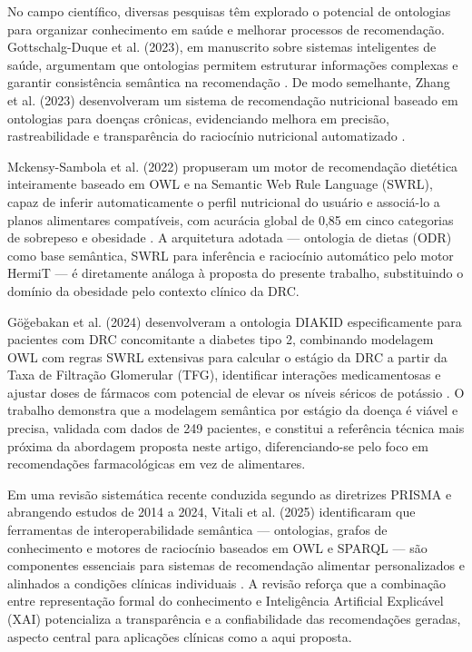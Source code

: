 \documentclass[12pt, a4paper, twocolumn]{article}
\begin{document}
No campo científico, diversas pesquisas têm explorado o potencial de ontologias para organizar conhecimento em saúde e melhorar processos de recomendação. Gottschalg-Duque et al. (2023), em manuscrito sobre sistemas inteligentes de saúde, argumentam que ontologias permitem estruturar informações complexas e garantir consistência semântica na recomendação \cite{paper_onto}. De modo semelhante, Zhang et al. (2023) desenvolveram um sistema de recomendação nutricional baseado em ontologias para doenças crônicas, evidenciando melhora em precisão, rastreabilidade e transparência do raciocínio nutricional automatizado \cite{zhang2023}.

Mckensy-Sambola et al. (2022) propuseram um motor de recomendação dietética inteiramente baseado em OWL e na Semantic Web Rule Language (SWRL), capaz de inferir automaticamente o perfil nutricional do usuário e associá-lo a planos alimentares compatíveis, com acurácia global de 0,85 em cinco categorias de sobrepeso e obesidade \cite{mckensy2022}. A arquitetura adotada --- ontologia de dietas (ODR) como base semântica, SWRL para inferência e raciocínio automático pelo motor HermiT --- é diretamente análoga à proposta do presente trabalho, substituindo o domínio da obesidade pelo contexto clínico da DRC.

Göğebakan et al. (2024) desenvolveram a ontologia DIAKID especificamente para pacientes com DRC concomitante a diabetes tipo 2, combinando modelagem OWL com regras SWRL extensivas para calcular o estágio da DRC a partir da Taxa de Filtração Glomerular (TFG), identificar interações medicamentosas e ajustar doses de fármacos com potencial de elevar os níveis séricos de potássio \cite{gogebakan2024}. O trabalho demonstra que a modelagem semântica por estágio da doença é viável e precisa, validada com dados de 249 pacientes, e constitui a referência técnica mais próxima da abordagem proposta neste artigo, diferenciando-se pelo foco em recomendações farmacológicas em vez de alimentares.

Em uma revisão sistemática recente conduzida segundo as diretrizes PRISMA e abrangendo estudos de 2014 a 2024, Vitali et al. (2025) identificaram que ferramentas de interoperabilidade semântica --- ontologias, grafos de conhecimento e motores de raciocínio baseados em OWL e SPARQL --- são componentes essenciais para sistemas de recomendação alimentar personalizados e alinhados a condições clínicas individuais \cite{vitali2025}. A revisão reforça que a combinação entre representação formal do conhecimento e Inteligência Artificial Explicável (XAI) potencializa a transparência e a confiabilidade das recomendações geradas, aspecto central para aplicações clínicas como a aqui proposta.
\end{document}
